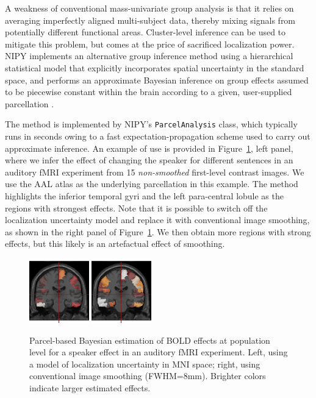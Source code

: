 \documentclass{bioinfo}
\begin{document}
A weakness of conventional mass-univariate group analysis is that it
relies on averaging imperfectly aligned multi-subject data, thereby
mixing signals from potentially different functional
areas. Cluster-level inference can be used to mitigate this problem,
but comes at the price of sacrificed localization power. NIPY
implements an alternative group inference method using a hierarchical
statistical model that explicitly incorporates spatial uncertainty
in the standard space, and performs an approximate Bayesian inference
on group effects assumed to be piecewise constant within the brain
according to a given, user-supplied parcellation
\citep{keller:sinica:08,keller:miccai:09}. 

The method is implemented by NIPY's {\tt ParcelAnalysis} class, which
typically runs in seconds owing to a fast expectation-propagation
scheme \citep{minka:techrep:05} used to carry out approximate
inference. An example of use is provided in
Figure~\ref{fig:parcel_group}, left panel, where we infer the effect
of changing the speaker for different sentences in an auditory fMRI
experiment from 15 {\em non-smoothed} first-level contrast images. We
use the AAL atlas \citep{tzourio:ni:02} as the underlying parcellation
in this example. The method highlights the inferior temporal gyri and
the left para-central lobule as the regions with strongest
effects. Note that it is possible to switch off the localization
uncertainty model and replace it with conventional image smoothing, as
shown in the right panel of Figure~\ref{fig:parcel_group}. We then
obtain more regions with strong effects, but this likely is an
artefactual effect of smoothing.

\begin{figure}
\begin{center}
  \includegraphics[width=0.23\textwidth]{parcel_group_analysis.png}
  \includegraphics[width=0.23\textwidth]{parcel_group_analysis_naive.png}
\end{center}
\caption{Parcel-based Bayesian estimation of BOLD effects at
  population level for a speaker effect in an auditory fMRI
  experiment. Left, using a model of localization uncertainty in MNI
  space; right, using conventional image smoothing
  (FWHM=8mm). Brighter colors indicate larger estimated effects.}
\label{fig:parcel_group}
\end{figure}
\end{document}
